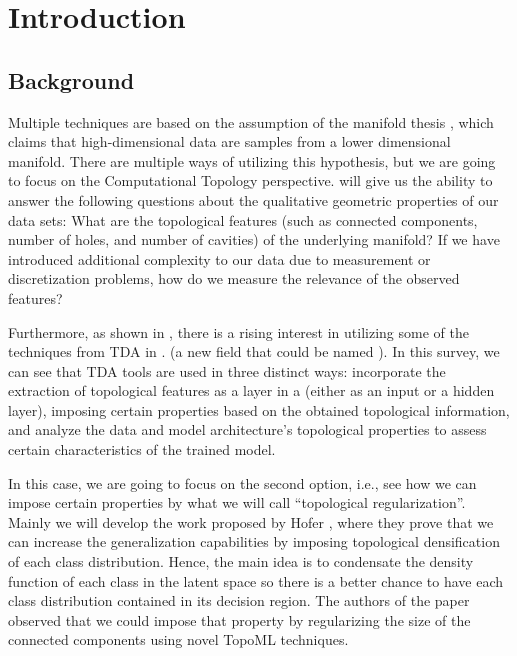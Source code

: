 \documentclass[../main.tex]{subfiles}
\begin{document}
\chapter{Introduction}
\label{ch:introduction}


\section{Background}
\label{sec:background}


Multiple  techniques are based on the assumption of the manifold thesis \cite{fefferman_testing_2016}, which claims that high-dimensional data are samples from a lower dimensional manifold. There are multiple ways of utilizing this hypothesis, but we are going to focus on the Computational Topology perspective.  will give us the ability to answer the following questions about the qualitative geometric properties of our data sets: What are the topological features (such as connected components, number of holes, and number of cavities) of the underlying manifold? If we have introduced additional complexity to our data due to measurement or discretization problems, how do we measure the relevance of the observed features? 


Furthermore, as shown in \cite{hensel_survey_2021}, there is a rising interest in utilizing some of the techniques from TDA in . (a new field that could be named ). In this survey, we can see that TDA tools are used in three distinct ways: incorporate the extraction of topological features as a layer in a  (either as an input or a hidden layer), imposing certain properties based on the obtained topological information, and analyze the data and model architecture's topological properties to assess certain characteristics of the trained model.  

In this case, we are going to focus on the second option, i.e., see how we can impose certain properties by what we will call ``topological regularization''. Mainly we will develop the work proposed by Hofer \etal \cite{hofer_densified_2021}, where they prove that we can increase the generalization capabilities by imposing topological densification of each class distribution. Hence, the main idea is to condensate the density function of each class in the latent space so there is a better chance to have each class distribution contained in its decision region. The authors of the paper observed that we could impose that property by regularizing the size of the connected components using novel TopoML techniques.\\
\end{document}
